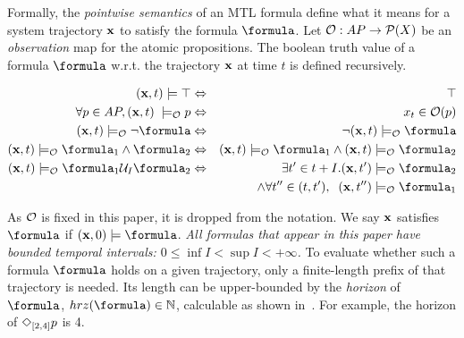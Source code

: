 Formally, the \textit{pointwise semantics} of an MTL formula define what it means for a system trajectory $\mathbf{x}$ to satisfy the formula $\formula$.
Let $\mathcal{O}: AP \rightarrow \mathcal{P}(X)$ be an \textit{observation} map for the atomic propositions.
The boolean truth value of a formula $\formula$ w.r.t. the trajectory $\mathbf{x}$ at time $t$ is defined recursively.
\begin{definition}
	\label{def:boolean sat}
	\begin{eqnarray*}
		\label{eq:boolean sat}
		(\sstraj,t) \models \top &\Leftrightarrow& \top
		\\
		\forall p \in AP, (\sstraj, t) \; \models_\Oc p &\Leftrightarrow& x_t \in \Oc(p)
		\\
		(\sstraj,t) \models_\Oc \neg \formula&\Leftrightarrow& \neg (\sstraj,t) \models_\Oc \formula
		\\
		(\sstraj,t) \models_\Oc  \formula_1 \land \formula_2&\Leftrightarrow& (\sstraj,t) \models_\Oc \formula_1 \land (\sstraj,t) \models_\Oc \formula_2
		\\
		(\sstraj,t) \models_\Oc \formula_1 \until_I \formula_2 &\Leftrightarrow& \exists t' \in t+I .  (\sstraj,t') \models_\Oc \formula_2  
		\\
		&& \, \land \forall t'' \in (t,t'), \;\; (\sstraj,t'') \models_\Oc \formula_1 
	\end{eqnarray*}
\end{definition}
As $\mathcal{O}$ is fixed in this paper, it is dropped from the notation.
We say $\mathbf{x}$ satisfies $\formula$ if $(\sstraj,0) \models \formula$.
\textit{All formulas that appear in this paper have bounded temporal intervals: $ 0\leq \inf I < \sup I < +\infty$.}
To evaluate whether such a formula $\formula$ holds on a given trajectory, only a finite-length prefix of that trajectory is needed.
Its length can be upper-bounded by the \textit{horizon} of $\formula$, $hrz(\formula) \in \Ne$, calculable as shown in~\cite{Dokhanchi14_OnlineMonitoring}. 
For example, the horizon of $\Diamond_{[2,4]}p$ is 4.

